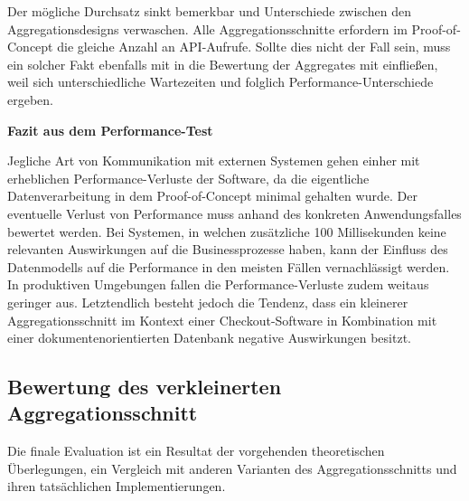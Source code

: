 Der mögliche Durchsatz sinkt bemerkbar und Unterschiede zwischen den Aggregationsdesigns verwaschen. Alle Aggregationsschnitte erfordern im Proof-of-Concept die gleiche Anzahl an API-Aufrufe. Sollte dies nicht der Fall sein, muss ein solcher Fakt ebenfalls mit in die Bewertung der Aggregates mit einfließen, weil sich unterschiedliche Wartezeiten und folglich Performance-Unterschiede ergeben. 


\textbf{Fazit aus dem Performance-Test}

Jegliche Art von Kommunikation mit externen Systemen gehen einher mit erheblichen Performance-Verluste der Software, da die eigentliche Datenverarbeitung in dem Proof-of-Concept minimal gehalten wurde. Der eventuelle Verlust von Performance muss anhand des konkreten Anwendungsfalles bewertet werden. Bei Systemen, in welchen zusätzliche 100 Millisekunden keine relevanten Auswirkungen auf die Businessprozesse haben, kann der Einfluss des Datenmodells auf die Performance in den meisten Fällen vernachlässigt werden. In produktiven Umgebungen fallen die Performance-Verluste zudem weitaus geringer aus. Letztendlich besteht jedoch die Tendenz, dass ein kleinerer Aggregationsschnitt im Kontext einer Checkout-Software in Kombination mit einer dokumentenorientierten Datenbank negative Auswirkungen besitzt.

\subsection{Bewertung des verkleinerten Aggregationsschnitt}

Die finale Evaluation ist ein Resultat der vorgehenden theoretischen Überlegungen, ein Vergleich mit anderen Varianten des Aggregationsschnitts und ihren tatsächlichen Implementierungen.

